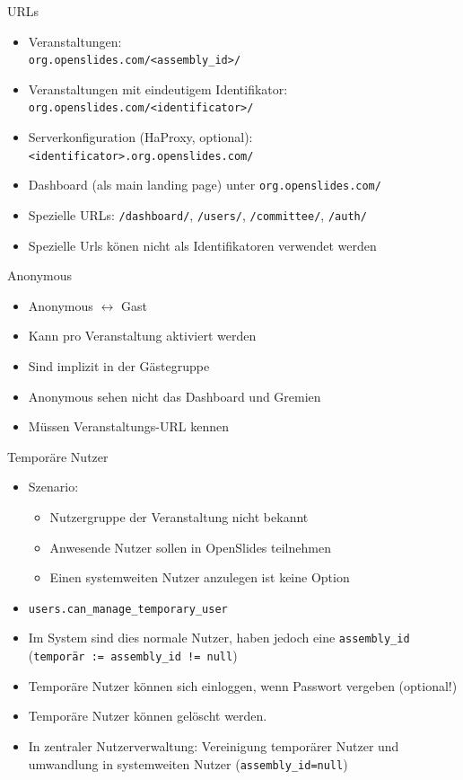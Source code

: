 \documentclass[10pt]{beamer}
\begin{document}
\begin{frame}{URLs}
	\begin{itemize}
		\item Veranstaltungen:\\\texttt{org.openslides.com/<assembly\_id>/}
		\item Veranstaltungen mit eindeutigem Identifikator: \texttt{org.openslides.com/<identificator>/}
		\item Serverkonfiguration (HaProxy, optional): \texttt{<identificator>.org.openslides.com/}
		\item<2-> Dashboard (als main landing page) unter \texttt{org.openslides.com/}
		\item<2-> Spezielle URLs: \texttt{/dashboard/}, \texttt{/users/}, \texttt{/committee/}, \texttt{/auth/}
		\item<2-> Spezielle Urls könen nicht als Identifikatoren verwendet werden
	\end{itemize}
\end{frame}
\begin{frame}{Anonymous}
	\begin{itemize}
		\item Anonymous $\leftrightarrow$ Gast
		\item Kann pro Veranstaltung aktiviert werden
		\item Sind implizit in der Gästegruppe
		\item Anonymous sehen nicht das Dashboard und Gremien
		\item Müssen Veranstaltungs-URL kennen
	\end{itemize}
\end{frame}
\begin{frame}{Temporäre Nutzer}
	\begin{itemize}
		\item Szenario:
		\begin{itemize}
			\item Nutzergruppe der Veranstaltung nicht bekannt
			\item Anwesende Nutzer sollen in OpenSlides teilnehmen
			\item Einen systemweiten Nutzer anzulegen ist keine Option
		\end{itemize}
		\item<2-> \texttt{users.can\_manage\_temporary\_user}
		\item<3-> Im System sind dies normale Nutzer, haben jedoch eine \texttt{assembly\_id} (\texttt{temporär := assembly\_id != null})
		\item<4-> Temporäre Nutzer können sich einloggen, wenn Passwort vergeben (optional!)
		\item<5-> Temporäre Nutzer können gelöscht werden.
		\item<6-> In zentraler Nutzerverwaltung: Vereinigung temporärer Nutzer und umwandlung in systemweiten Nutzer (\texttt{assembly\_id=null})
	\end{itemize}
\end{frame}
\end{document}
